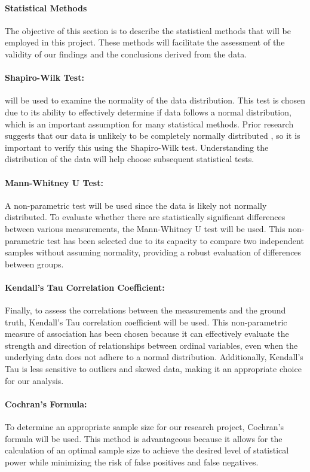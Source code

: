 \paragraph{Statistical Methods}
The objective of this section is to describe the statistical methods that will be employed in this project. These methods will facilitate the assessment of the validity of our findings and the conclusions derived from the data.

\paragraph{Shapiro-Wilk Test:}
will be used to examine the normality of the data distribution. This test is chosen due to its ability to effectively determine if data follows a normal distribution, which is an important assumption for many statistical methods. Prior research suggests that our data is unlikely to be completely normally distributed \cite{biksbois}, so it is important to verify this using the Shapiro-Wilk test. Understanding the distribution of the data will help choose subsequent statistical tests.

\paragraph{Mann-Whitney U Test:}
A non-parametric test will be used since the data is likely not normally distributed. To evaluate whether there are statistically significant differences between various measurements, the Mann-Whitney U test will be used. This non-parametric test has been selected due to its capacity to compare two independent samples without assuming normality, providing a robust evaluation of differences between groups.

\paragraph{Kendall's Tau Correlation Coefficient:}
Finally, to assess the correlations between the measurements and the ground truth, Kendall's Tau correlation coefficient will be used. This non-parametric measure of association has been chosen because it can effectively evaluate the strength and direction of relationships between ordinal variables, even when the underlying data does not adhere to a normal distribution. Additionally, Kendall's Tau is less sensitive to outliers and skewed data, making it an appropriate choice for our analysis.

\paragraph{Cochran's Formula:}
To determine an appropriate sample size for our research project, Cochran's formula will be used. This method is advantageous because it allows for the calculation of an optimal sample size to achieve the desired level of statistical power while minimizing the risk of false positives and false negatives.

